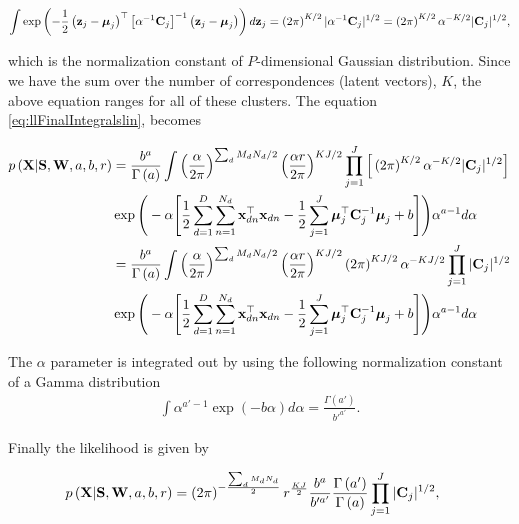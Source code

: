 	\begin{align}
	\int \exp\left(-\frac{1}{2}\left(\mathbf{z}_j-\boldsymbol{\mu}_j\right)^\top\left[\alpha^{-1}\mathbf{C}_j\right]^{-1}\left(\mathbf{z}_j-\boldsymbol{\mu}_j\right)\right)d\mathbf{z}_j = \left(2\pi\right)^{K/2}|\alpha^{-1}\mathbf{C}_j|^{1/2} = \left(2\pi\right)^{K/2}\alpha^{-K/2}|\mathbf{C}_j|^{1/2},
	\end{align}
	
	which is the normalization constant of $P$-dimensional Gaussian distribution. Since we have the sum over the number of correspondences (latent vectors), $K$, the above equation ranges for all of these clusters. The equation \eqref{eq:llFinalIntegralslin}, becomes
	
	\begin{align}
	p\left(\mathbf{X}|\mathbf{S},\mathbf{W},a,b,r\right) &=\frac{b^a}{\Gamma\left(a\right)}\int \left(\frac{\alpha}{2\pi}\right)^{\sum_d M_d N_d /2}\left(\frac{\alpha r}{2\pi}\right)^{KJ/2} \prod_{j=1}^{J}\Big[\left(2\pi\right)^{K/2}\alpha^{-K/2}|\mathbf{C}_j|^{1/2}\Big]
	\notag\\
	&\exp\Bigg(-\alpha\Bigg[\frac{1}{2} \sum_{d=1}^{D}\sum_{n=1}^{N_d}\mathbf{x}_{dn}^\top \mathbf{x}_{dn} -\frac{1}{2}\sum_{j=1}^{J}\boldsymbol{\mu}_j^\top\mathbf{C}_j^{-1}\boldsymbol{\mu}_j +b \Bigg]\Bigg)\alpha^{a-1}d\alpha \\
	&=\frac{b^a}{\Gamma\left(a\right)}\int \left(\frac{\alpha}{2\pi}\right)^{\sum_d M_d N_d /2}\left(\frac{\alpha r}{2\pi}\right)^{KJ/2} \left(2\pi\right)^{KJ/2}\alpha^{-KJ/2}\prod_{j=1}^{J}|\mathbf{C}_j|^{1/2} \notag\\
	&\exp\Bigg(-\alpha\Bigg[\frac{1}{2} \sum_{d=1}^{D}\sum_{n=1}^{N_d}\mathbf{x}_{dn}^\top\mathbf{x}_{dn} -\frac{1}{2}\sum_{j=1}^{J}\boldsymbol{\mu}_j^\top\mathbf{C}_j^{-1}\boldsymbol{\mu}_j +b \Bigg]\Bigg)\alpha^{a-1}d\alpha\label{eq:llFinalIntegralZlin}
	\end{align}
	
	The $\alpha$ parameter is integrated out by using the following normalization constant of a Gamma distribution 
	\begin{align}
	\int \alpha^{a'-1}\exp\left(-b\alpha\right)d\alpha = \frac{\Gamma\left(a'\right)}{b'^{a'}}.
	\end{align}
	
	Finally the likelihood is given by
	
	\begin{align}
	p\left(\mathbf{X}|\mathbf{S},\mathbf{W},a,b,r\right) &=\left(2\pi\right)^{-\frac{\sum_d M_d N_d}{2}}r^{\frac{KJ}{2}}\frac{b^{a}}{b'^{a'}}\frac{\Gamma\left(a'\right)}{\Gamma\left(a\right)}\prod_{j=1}^{J}|\mathbf{C}_j|^{1/2},
	\label{eq:llFinalIntegrallastlin}
	\end{align}
	
